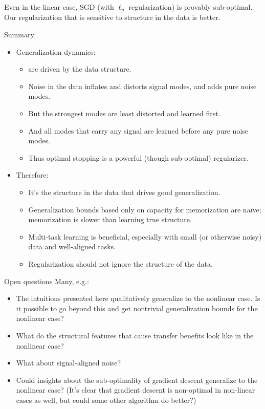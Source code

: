 \documentclass{beamer}
\begin{document}
\begin{frame}[standout]
Even in the linear case, SGD (with $\ell_p$ regularization) is provably sub-optimal.\\[1em]
Our regularization that is sensitive to structure in the data is better.
\end{frame}

\begin{frame}{Summary}
\begin{itemize}[<+->]
\item Generalization dynamics:
    \begin{itemize}
    \item are driven by the data structure.
    \item Noise in the data inflates and distorts signal modes, and adds pure noise modes.
    \item But the strongest modes are least distorted and learned first.
    \item And all modes that carry any signal are learned before any pure noise modes.
    \item Thus optimal stopping is a powerful (though sub-optimal) regularizer.
    \end{itemize}
\item Therefore:
    \begin{itemize}
    \item It's the structure in the data that drives good generalization.
    \item Generalization bounds based only on capacity for memorization are na{\"i}ve; memorization is slower than learning true structure.
    \item Multi-task learning is beneficial, especially with small (or otherwise noisy) data and well-aligned tasks.
    \item Regularization should not ignore the structure of the data.
    \end{itemize}
\end{itemize}
\end{frame}

\begin{frame}{Open questions}
Many, e.g.:
\begin{itemize}
\item The intuitions presented here qualitatively generalize to the nonlinear case. Is it possible to go beyond this and get nontrivial generalization bounds for the nonlinear case? 
\item What do the structural features that cause transfer benefits look like in the nonlinear case?
\item What about signal-aligned noise?
\item Could insights about the sub-optimality of gradient descent generalize to the nonlinear case? (It's clear that gradient descent is non-optimal in non-linear cases as well, but could some other algorithm do better?)
\end{itemize}
\end{frame}
\end{document}
